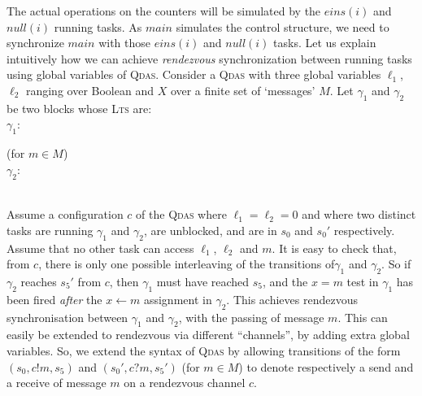 \documentclass[runningheads,oribibl,]{article}
\newcommand{\main}{\ensuremath{\textit{main}}\xspace}
\newcommand{\lts}{\textsc{Lts}\xspace}
\newcommand{\qdas}{\textsc{Qdas}\xspace}
\begin{document}
The actual operations on the counters will be simulated by the
$eins(i)$ and $null(i)$ running tasks. As \main simulates the control
structure, we need to synchronize
\main with those $eins(i)$ and $null(i)$ tasks.  Let us explain
intuitively how we can achieve \emph{rendezvous} synchronization
between running tasks using global variables of \qdas. Consider a
\qdas with three global variables $\ell_1$, $\ell_2$ ranging over
Boolean and $X$ over a finite set of `messages' $M$.
Let $\gamma_1$ and $\gamma_2$ be two blocks whose \lts
are:\\
$\gamma_1$: \hfill (for $m\in M$)\\
$\gamma_2$: \\
Assume a configuration $c$ of the \qdas where $\ell_1=\ell_2=0$ and
where two distinct tasks are running $\gamma_1$ and $\gamma_2$, are
unblocked, and are in $s_0$ and $s_0'$ respectively.  Assume that no
other task can access $\ell_1$, $\ell_2$ and $m$. It is easy to check
that, from $c$, there is only one possible interleaving of the transitions
of$\gamma_1$ and $\gamma_2$. So if $\gamma_2$ reaches $s_5'$ from $c$,
then $\gamma_1$ must have reached $s_5$, and the $x=m$ test in
$\gamma_1$ has been fired \emph{after} the $x\gets m$ assignment in
$\gamma_2$. This achieves rendezvous synchronisation between
$\gamma_1$ and $\gamma_2$, with the passing of message $m$. This can
easily be extended to rendezvous via different ``channels'', by adding
extra global variables. So, we extend the syntax of
\qdas by allowing transitions of the form $(s_0,c!m,s_5)$ and
$(s_0',c?m,s_5')$ (for $m\in M$) to denote respectively a send and a
receive of message $m$ on a rendezvous channel $c$.
\end{document}
